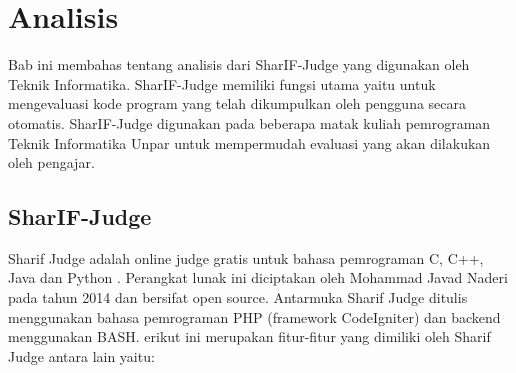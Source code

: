 \chapter{Analisis}
\label{chap:analisis}
Bab ini membahas tentang analisis dari SharIF-Judge yang digunakan oleh Teknik Informatika. SharIF-Judge memiliki fungsi utama yaitu untuk mengevaluasi kode program yang telah dikumpulkan oleh pengguna secara otomatis. SharIF-Judge digunakan pada beberapa matak kuliah pemrograman Teknik Informatika Unpar untuk mempermudah evaluasi yang akan dilakukan oleh pengajar.

\section{SharIF-Judge}
\label{sec: SharIF-Judge}
Sharif Judge adalah online judge gratis untuk bahasa pemrograman C, C++, Java dan Python \cite{sharif_judge}. Perangkat lunak ini diciptakan oleh Mohammad Javad Naderi pada tahun 2014 dan bersifat open source. Antarmuka Sharif Judge ditulis menggunakan bahasa pemrograman PHP (framework CodeIgniter) dan backend menggunakan BASH.
erikut ini merupakan fitur-fitur yang dimiliki oleh Sharif Judge antara lain yaitu:
